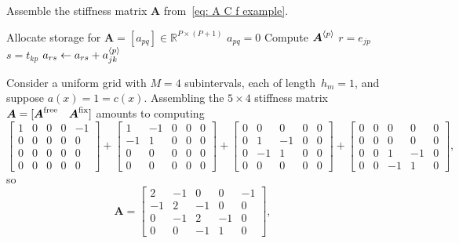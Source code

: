 \begin{algorithm}
\caption{Assemble the stiffness matrix $\boldsymbol{A}$
from~\eqref{eq: A C f example}.}
\label{alg: assemble A piecewise linear}
\begin{algorithmic}
\State Allocate storage for
$\boldsymbol{A}=[a_{pq}]\in\mathbb{R}^{P\times(P+1)}$
        \State $a_{pq}=0$
    \EndFor
\EndFor
{}
    \State Compute $\boldsymbol{A}^{\langle p\rangle}$
        \State $r=e_{jp}$
                \State $s=t_{kp}$
                \State $a_{rs}\gets a_{rs}+a^{\langle p\rangle}_{jk}$
            \EndFor
        \EndIf
    \EndFor
\EndFor
\end{algorithmic}
\end{algorithm}

\begin{example}\label{example: assemble A}
Consider a uniform grid with $M=4$ subintervals, each of length~$h_m=1$,
and suppose $a(x)=1=c(x)$. Assembling the $5\times4$ stiffness 
matrix~$\boldsymbol{A}=[\boldsymbol{A}^{\mathrm{free}}\quad\boldsymbol{A}^{\mathrm{fix}}]$ amounts 
to computing
\[
\left[
\begin{array}{cccc|c}1&0&0&0&-1\\0&0&0&0&0\\0&0&0&0&0\\0&0&0&0&0\end{array}
\right]+\left[
\begin{array}{cccc|c}1&-1&0&0&0\\-1&1&0&0&0\\0&0&0&0&0\\0&0&0&0&0\end{array}
\right]+\left[
\begin{array}{cccc|c}0&0&0&0&0\\0&1&-1&0&0\\0&-1&1&0&0\\0&0&0&0&0\end{array}
\right]+\left[
\begin{array}{cccc|c}0&0&0&0&0\\0&0&0&0&0\\0&0&1&-1&0\\0&0&-1&1&0\end{array}
\right],
\]
so
\[
\boldsymbol{A}=\left[\begin{array}{cccc|c}
2&-1&0&0&-1\\ -1&2&-1&0&0\\ 0&-1&2&-1&0\\ 0&0&-1&1&0\end{array}\right],\qquad
\]
\end{example}
